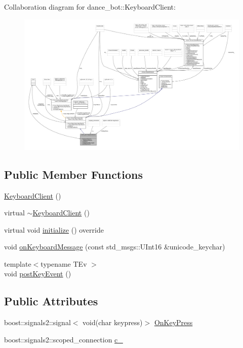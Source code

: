 Collaboration diagram for dance\+\_\+bot\+:\+:Keyboard\+Client\+:
\nopagebreak
\begin{figure}[H]
\begin{center}
\leavevmode
\includegraphics[width=350pt]{classdance__bot_1_1KeyboardClient__coll__graph}
\end{center}
\end{figure}
\subsection*{Public Member Functions}
\begin{DoxyCompactItemize}
\item 
\hyperlink{classdance__bot_1_1KeyboardClient_a9eca90df01ec0e231fb3ed1a7d830197}{Keyboard\+Client} ()
\item 
virtual \hyperlink{classdance__bot_1_1KeyboardClient_a699a4f23b24c8fa51dfe85a001a1371b}{$\sim$\+Keyboard\+Client} ()
\item 
virtual void \hyperlink{classdance__bot_1_1KeyboardClient_aaf0de36cfc92f79e8cb036defab43afd}{initialize} () override
\item 
void \hyperlink{classdance__bot_1_1KeyboardClient_a17a184bb276d2de8c8ae6622db736761}{on\+Keyboard\+Message} (const std\+\_\+msgs\+::\+U\+Int16 \&unicode\+\_\+keychar)
\item 
{\footnotesize template$<$typename T\+Ev $>$ }\\void \hyperlink{classdance__bot_1_1KeyboardClient_a8b1f980191a031623044937c7f162597}{post\+Key\+Event} ()
\end{DoxyCompactItemize}
\subsection*{Public Attributes}
\begin{DoxyCompactItemize}
\item 
boost\+::signals2\+::signal$<$ void(char keypress)$>$ \hyperlink{classdance__bot_1_1KeyboardClient_a96fc4ee6a96424305a43d3d23fe66695}{On\+Key\+Press}
\item 
boost\+::signals2\+::scoped\+\_\+connection \hyperlink{classdance__bot_1_1KeyboardClient_ad2318d9d1107915d721f9457c10f1ee6}{c\+\_\+}
\end{DoxyCompactItemize}
